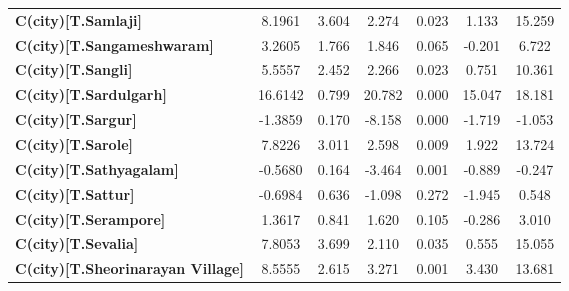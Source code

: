 \begin{center}
\begin{tabular}{lcccccc}
\textbf{C(city)[T.Samlaji]}                                                                         &       8.1961  &        3.604     &     2.274  &         0.023        &        1.133    &       15.259     \\
\textbf{C(city)[T.Sangameshwaram]}                                                                  &       3.2605  &        1.766     &     1.846  &         0.065        &       -0.201    &        6.722     \\
\textbf{C(city)[T.Sangli]}                                                                          &       5.5557  &        2.452     &     2.266  &         0.023        &        0.751    &       10.361     \\
\textbf{C(city)[T.Sardulgarh]}                                                                      &      16.6142  &        0.799     &    20.782  &         0.000        &       15.047    &       18.181     \\
\textbf{C(city)[T.Sargur]}                                                                          &      -1.3859  &        0.170     &    -8.158  &         0.000        &       -1.719    &       -1.053     \\
\textbf{C(city)[T.Sarole]}                                                                          &       7.8226  &        3.011     &     2.598  &         0.009        &        1.922    &       13.724     \\
\textbf{C(city)[T.Sathyagalam]}                                                                     &      -0.5680  &        0.164     &    -3.464  &         0.001        &       -0.889    &       -0.247     \\
\textbf{C(city)[T.Sattur]}                                                                          &      -0.6984  &        0.636     &    -1.098  &         0.272        &       -1.945    &        0.548     \\
\textbf{C(city)[T.Serampore]}                                                                       &       1.3617  &        0.841     &     1.620  &         0.105        &       -0.286    &        3.010     \\
\textbf{C(city)[T.Sevalia]}                                                                         &       7.8053  &        3.699     &     2.110  &         0.035        &        0.555    &       15.055     \\
\textbf{C(city)[T.Sheorinarayan Village]}                                                           &       8.5555  &        2.615     &     3.271  &         0.001        &        3.430    &       13.681     \\

\end{tabular}
\end{center}

